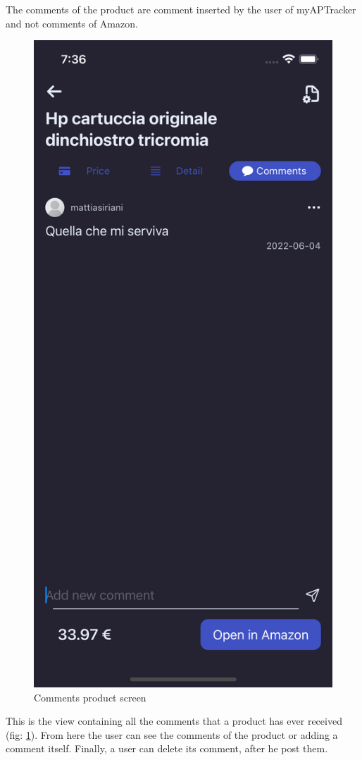 The comments of the product are comment inserted by the user of myAPTracker and not comments of Amazon.
\begin{figure}[h!]
        \centering
        \includegraphics[scale=0.15]{images/interfaces/comments_product_screen.png}
        \caption{Comments product screen}
        \label{fig:comments_product_screen}
\end{figure}
\FloatBarrier
This is the view containing all the comments that a product has ever received (fig: \ref{fig:comments_product_screen}). From here the user can see the comments of the product or adding a comment itself.
Finally, a user can delete its comment, after he post them.
\\\\

